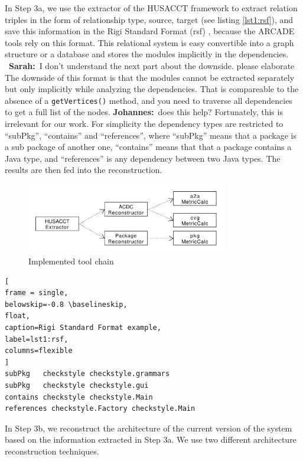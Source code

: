 \documentclass[sigplan, anonymous, review]{acmart}
\newcommand{\sn}[1]{{\color{blue}\textbf{Sarah:}~#1}}
\newcommand{\jk}[1]{{\color{violet}\textbf{Johannes:}~#1}}
\begin{document}
In Step 3a, we use the extractor of the HUSACCT framework \cite{Husacct1} to extract relation triples in the form of relationship type, source, target (see listing \ref{lst1:rsf}), and save this information in the Rigi Standard Format (rsf) \cite{RSF}, because the ARCADE tools rely on this format. This relational system is easy convertible into a graph structure or a database and stores the modules implicitly in the dependencies. 
~\sn{I don't understand the next part about the downside. please elaborate} The downside of this format is that the modules cannot be extracted separately but only implicitly while analyzing the dependencies. That is compareable to the absence of a \texttt{getVertices()} method, and you need to traverse all dependencies to get a full list of the nodes. \jk{does this help?}
Fortunately, this is irrelevant for our work. For simplicity the dependency types are restricted to ``subPkg'', ``contains'' and ``references'', where ``subPkg'' means that a package is a sub package of another one, ``contains'' means that that a package contains a Java type, and ``references'' is any dependency between two Java types. The results are then fed into the reconstruction.

\begin{figure}[!t]
	\centering
	\includegraphics[width=3.45in]{assets/implementedArc.pdf}
	\caption{Implemented tool chain}
	\label{implToolchain}
\end{figure}

\begin{lstlisting}[
frame = single, 
belowskip=-0.8 \baselineskip,
float,
caption=Rigi Standard Format example,
label=lst1:rsf,
columns=flexible
]
subPkg   checkstyle checkstyle.grammars
subPkg   checkstyle checkstyle.gui
contains checkstyle checkstyle.Main
references checkstyle.Factory checkstyle.Main
\end{lstlisting}



In Step 3b, we reconstruct the architecture of the current version of the system based on the information extracted in Step 3a. We use two different architecture reconstruction techniques.
\end{document}
